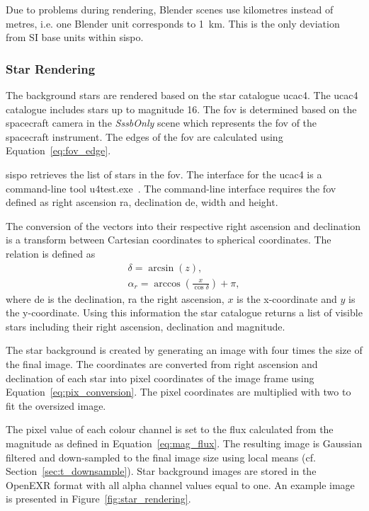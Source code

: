 Due to problems during rendering, Blender scenes use kilometres instead of metres, i.e. one Blender unit corresponds to \SI{1}{\kilo\meter}. This is the only deviation from SI base units within \gls{sispo}.

\subsubsection{Star Rendering} \label{sec:stars}
The background stars are rendered based on the star catalogue \gls{ucac4}. The \gls{ucac4} catalogue includes stars up to magnitude 16. The \gls{fov} is determined based on the spacecraft camera in the \textit{SssbOnly} scene which represents the \gls{fov} of the spacecraft instrument. The edges of the \gls{fov} are calculated using Equation~\ref{eq:fov_edge}.

\Gls{sispo} retrieves the list of stars in the \gls{fov}. The interface for the \gls{ucac4} is a command-line tool u4test.exe~\cite{gray}. The command-line interface requires the \gls{fov} defined as right ascension \gls{ra}, declination \gls{de}, width and height.

The conversion of the vectors into their respective right ascension and declination is a transform between Cartesian coordinates to spherical coordinates. The relation is defined as
\begin{align}
    \delta = \arcsin{(z)}, \label{eq:declination} \\
    \alpha_r = \arccos{\left(\frac{x}{\cos{\delta}}\right)} + \pi, \label{eq:right_ascension}
\end{align}
where \gls{de} is the declination, \gls{ra} the right ascension, $x$ is the x-coordinate and $y$ is the y-coordinate. Using this information the star catalogue returns a list of visible stars including their right ascension, declination and magnitude.

The star background is created by generating an image with four times the size of the final image. The coordinates are converted from right ascension and declination of each star into pixel coordinates of the image frame using Equation~\ref{eq:pix_conversion}. The pixel coordinates are multiplied with two to fit the oversized image.

The pixel value of each colour channel is set to the flux calculated from the magnitude as defined in Equation~\ref{eq:mag_flux}. The resulting image is Gaussian filtered and down-sampled to the final image size using local means (cf. Section~\ref{sec:t_downsample}). Star background images are stored in the OpenEXR format with all alpha channel values equal to one. An example image is presented in Figure~\ref{fig:star_rendering}.

